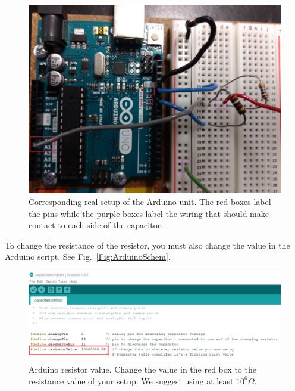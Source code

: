 \documentclass[12pt]{report}
\begin{document}
\begin{appendix}
\begin{figure}[h]
\centering
\includegraphics[width=0.8 \textwidth]{lab1-Arduino-circuit-board.jpg}
\caption{Corresponding real setup of the Arduino unit. The red boxes label the pins while the purple boxes label the wiring that should make contact to each side of the capacitor.}
\label{Fig:Arduino-real.png}
\end{figure}

To change the resistance of the resistor, you must also change the value in the Arduino script. See Fig.~\ref{Fig:ArduinoSchem}.
\begin{figure}[H]
\centering
\includegraphics[width=0.9 \textwidth]{lab1-Arduino-resistance.png}
\caption{Arduino resistor value. Change the value in the red box to the resistance value of your setup. We suggest using at least $10^6 \Omega$.}
\label{Fig:ArduinoResistance}
\end{figure}


\end{appendix}
\end{document}
